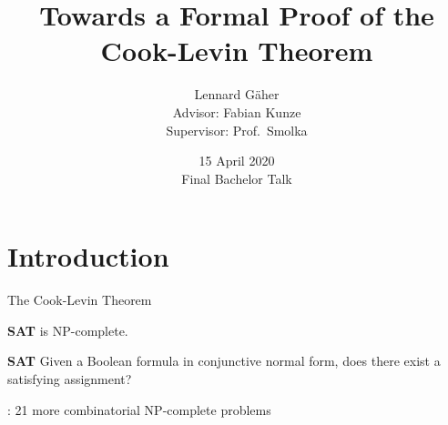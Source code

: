 \documentclass[11pt,usenames,dvipsnames,
hyperref={pdfencoding=auto,psdextra}]{beamer}
\title{Towards a Formal Proof of the Cook-Levin Theorem}
\institute{Saarland University}
\date{15 April 2020\\[1ex]Final Bachelor Talk}
\author{Lennard Gäher\\[1mm] {\small{Advisor: Fabian Kunze}\\ \small{Supervisor: Prof.\ Smolka}}}
\newcommand{\colorHTwo}{\color{blue}}
\let\otp\titlepage
\renewcommand{\titlepage}{\otp\addtocounter{framenumber}{-1}}
\newcommand*{\sat}{\textbf{SAT}}
\newcommand{\NP}{\textsf{NP}}
\begin{document}
\begin{frame}[plain]
  \titlepage
\end{frame}

\section{Introduction}
\begin{frame}{The Cook-Levin Theorem}
   
  \begin{center}
    \sat{} is \NP{}-complete\cite{Cook:1971:CTP:800157.805047, levin_theorem}.
  \end{center}
  \vspace{2ex}

  \begin{block}{\sat{}}
    Given a Boolean formula in conjunctive normal form, does there exist a satisfying assignment?
  \end{block}

  \vspace{2ex}
  \cite{Karp1972}: 21 more combinatorial \NP{}-complete problems

  \vspace{3ex}

\end{frame}




\end{document}
